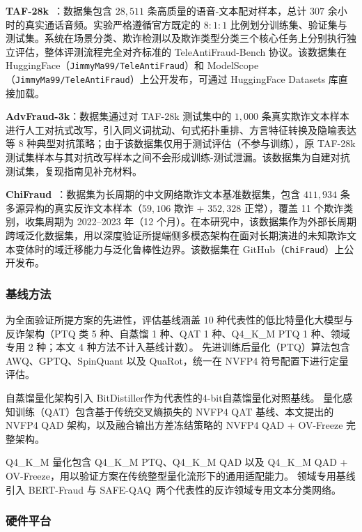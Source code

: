 \documentclass[11pt, a4paper]{article}
\begin{document}
\textbf{TAF-28k}~\cite{1}：数据集包含 $28,511$ 条高质量的语音-文本配对样本，总计 $307$ 余小时的真实通话音频。实验严格遵循官方既定的 $8:1:1$ 比例划分训练集、验证集与测试集。系统在场景分类、欺诈检测以及欺诈类型分类三个核心任务上分别执行独立评估，整体评测流程完全对齐标准的 TeleAntiFraud-Bench 协议。该数据集在 HuggingFace（\texttt{JimmyMa99/TeleAntiFraud}）和 ModelScope（\texttt{JimmyMa99/TeleAntiFraud}）上公开发布，可通过 HuggingFace Datasets 库直接加载。
   
\textbf{AdvFraud-3k}：数据集通过对 TAF-28k 测试集中的 $1{,}000$ 条真实欺诈文本样本进行人工对抗式改写，引入同义词扰动、句式拓扑重排、方言特征转换及隐喻表达等 $8$ 种典型对抗策略；由于该数据集仅用于测试评估（不参与训练），原 TAF-28k 测试集样本与其对抗改写样本之间不会形成训练-测试泄漏。该数据集为自建对抗测试集，复现指南见补充材料。
   
\textbf{ChiFraud}~\cite{chifraud}：数据集为长周期的中文网络欺诈文本基准数据集，包含 $411{,}934$ 条多源异构的真实反诈文本样本（$59{,}106$ 欺诈 + $352{,}328$ 正常），覆盖 11 个欺诈类别，收集周期为 2022--2023 年（12 个月）。在本研究中，该数据集作为外部长周期跨域泛化数据集，用以深度验证所提端侧多模态架构在面对长期演进的未知欺诈文本变体时的域迁移能力与泛化鲁棒性边界。该数据集在 GitHub（\texttt{ChiFraud}）上公开发布。

\subsubsection{基线方法}

为全面验证所提方案的先进性，评估基线涵盖 $10$ 种代表性的低比特量化大模型与反诈架构（PTQ 类 5 种、自蒸馏 1 种、QAT 1 种、Q4\_K\_M PTQ 1 种、领域专用 2 种；本文 4 种方法不计入基线计数）。
先进训练后量化（PTQ）算法包含 AWQ、GPTQ、SpinQuant 以及 QuaRot，统一在 NVFP4 符号配置下进行定量评估。

自蒸馏量化架构引入 BitDistiller作为代表性的4-bit自蒸馏量化对照基线。
量化感知训练（QAT）包含基于传统交叉熵损失的 NVFP4 QAT 基线、本文提出的 NVFP4 QAD 架构，以及融合输出方差冻结策略的 NVFP4 QAD + OV-Freeze 完整架构。 

Q4\_K\_M 量化包含 Q4\_K\_M PTQ、Q4\_K\_M QAD 以及 Q4\_K\_M QAD + OV-Freeze，用以验证方案在传统整型量化流形下的通用适配能力。 
领域专用基线引入 BERT-Fraud 与 SAFE-QAQ~两个代表性的反诈领域专用文本分类网络。

\subsubsection{硬件平台}
\end{document}
